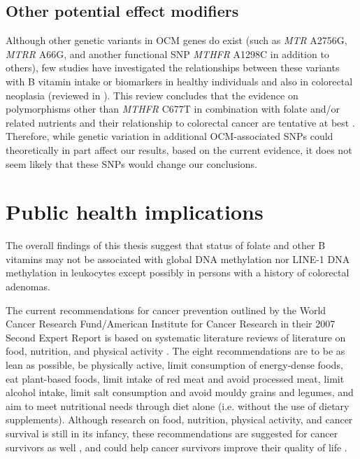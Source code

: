 \subsection{Other potential effect modifiers} %
\noindent Although other genetic variants in OCM genes do exist (such as \emph{MTR} A2756G, \emph{MTRR} A66G, and another functional SNP \emph{MTHFR} A1298C in addition to others), few studies have investigated the relationships between these variants with B vitamin intake or biomarkers in healthy individuals and also in colorectal neoplasia (reviewed in \cite{c785}). This review concludes that the evidence on polymorphisms other than \emph{MTHFR} C677T in combination with folate and/or related nutrients and their relationship to colorectal cancer are tentative at best \cite{c785}. Therefore, while genetic variation in additional OCM-associated SNPs could theoretically in part affect our results, based on the current evidence, it does not seem likely that these SNPs would change our conclusions. 
 
\section{Public health implications} %
\noindent The overall findings of this thesis suggest that status of folate and other B vitamins may not be associated with global  DNA methylation nor LINE-1 DNA methylation in leukocytes except possibly in persons with a history of colorectal adenomas. 
 
\noindent The current recommendations for cancer prevention outlined by the World Cancer Research Fund/American Institute for Cancer Research in their 2007 Second Expert Report is based on systematic literature reviews of literature on food, nutrition, and physical activity \cite{c786}. The eight recommendations are to be as lean as possible, be physically active, limit consumption of energy-dense foods, eat plant-based foods, limit intake of red meat and avoid processed meat, limit alcohol intake, limit salt consumption and avoid mouldy grains and legumes, and aim to meet nutritional needs through diet alone (i.e. without the use of dietary supplements). Although research on food, nutrition, physical activity, and cancer survival is still in its infancy, these recommendations are suggested for cancer survivors as well \cite{c786}, and could help cancer survivors improve their quality of life \cite{c787}. 
 
